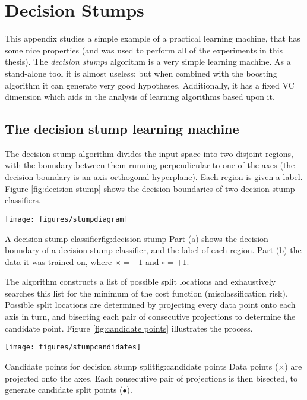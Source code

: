 
\chapter{Decision Stumps}
\label{appendix:stumps}

This appendix studies a simple example of a
practical learning machine, that has some nice properties (and was used
to perform all of the experiments in this thesis).
The \emph{decision stumps} algorithm is a very simple learning
machine.  As a stand-alone tool it is almost useless; but when
combined with the boosting algorithm it can generate very good
hypotheses.  Additionally, it has a fixed VC dimension which aids in
the analysis of learning algorithms based upon it.

\section{The decision stump learning machine}

The decision stump algorithm divides the input space into two disjoint
regions, with the boundary between them running perpendicular to one
of the axes (the decision boundary is an axis-orthogonal hyperplane).
Each region is given a label.  Figure \ref{fig:decision stump} shows
the decision boundaries of two decision stump classifiers.

\begin{linefigure}
\begin{center}
\texttt{[image: figures/stumpdiagram]}
\end{center}
\begin{capt}{A decision stump classifier}{fig:decision stump}
Part (a) shows the decision boundary of a decision stump classifier,
and the label of each region.  Part (b) the data it was trained on,
where $\times = -1$ and $\circ = +1$.
\end{capt}
\end{linefigure}

The algorithm constructs a list of possible split locations and
exhaustively searches this list for the minimum of the cost function
(misclassification risk).  Possible split locations are determined by
projecting every data point onto each axis in turn, and bisecting each
pair of consecutive projections to determine the candidate point.
Figure \ref{fig:candidate points} illustrates the process.

\begin{linefigure}
\begin{center}
\texttt{[image: figures/stumpcandidates]}
\end{center}
\begin{capt}{Candidate points for decision stump split}{fig:candidate points}
Data points ($\times$) are projected onto the axes.  Each consecutive
pair of projections is then bisected, to generate candidate split
points ($\bullet$).
\end{capt}
\end{linefigure}

